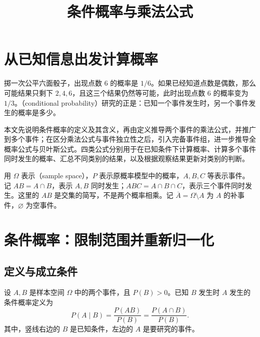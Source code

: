 \documentclass[UTF8]{ctexart}
\title{条件概率与乘法公式}
\author{}
\date{}
\begin{document}
\maketitle

\section{从已知信息出发计算概率}
\label{sec:conditional-product-introduction}

掷一次公平六面骰子，出现点数 $6$ 的概率是 $1/6$。如果已经知道点数是偶数，那么可能结果只剩下 $2,4,6$，且这三个结果仍然等可能，此时出现点数 $6$ 的概率变为 $1/3$。（conditional probability）研究的正是：已知一个事件发生时，另一个事件发生的概率是多少。

本文先说明条件概率的定义及其含义，再由定义推导两个事件的乘法公式，并推广到多个事件；在区分乘法公式与事件独立性之后，引入完备事件组，进一步推导全概率公式与贝叶斯公式。四类公式分别用于在已知条件下计算概率、计算多个事件同时发生的概率、汇总不同类别的结果，以及根据观察结果更新对类别的判断。

用 $\Omega$ 表示（sample space），$P$ 表示原概率模型中的概率，$A,B,C$ 等表示事件。记 $AB=A\cap B$，表示 $A,B$ 同时发生；$ABC=A\cap B\cap C$，表示三个事件同时发生。这里的 $AB$ 是交集的简写，不是两个概率相乘。记 $\overline A=\Omega\setminus A$ 为 $A$ 的补事件，$\varnothing$ 为空事件。

\section{条件概率：限制范围并重新归一化}
\label{sec:conditional-product-definition}

\subsection{定义与成立条件}

\begin{definition}[条件概率]
\label{def:conditional-product-conditional}
设 $A,B$ 是样本空间 $\Omega$ 中的两个事件，且 $P(B)>0$。已知 $B$ 发生时 $A$ 发生的条件概率定义为
\begin{equation}
  P(A\mid B)=\frac{P(AB)}{P(B)}
            =\frac{P(A\cap B)}{P(B)}.
  \label{eq:conditional-product-definition}
\end{equation}
其中，竖线右边的 $B$ 是已知条件，左边的 $A$ 是要研究的事件。
\end{definition}
\end{document}
